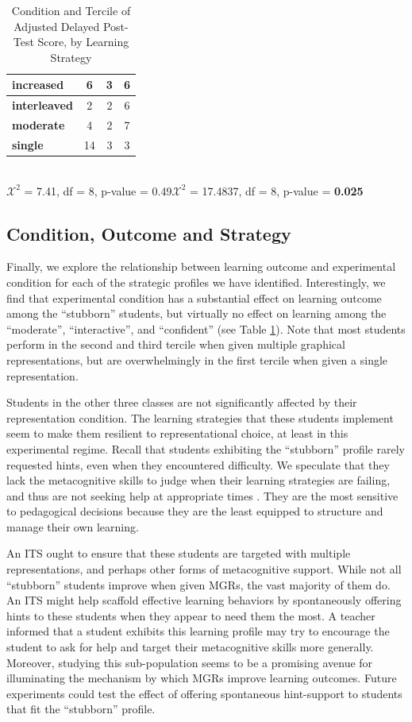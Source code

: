 \documentclass{edm_template}
\begin{document}
\begin{table}[htbp]
\begin{center}
\begin{tabular}{|l || c | c | c |}
  \textbf{increased}&    6&  3&  6 \\ \hline
  \textbf{interleaved}&  2&  2&  6 \\ \hline
  \textbf{moderate}&     4&  2& 7 \\ \hline
  \textbf{single}&       14&  3&  3 \\ \hline
 \end{tabular}
\\$\mathcal{X}^2$ = 7.41, df = 8, p-value = 0.49\hspace{15pt}$\mathcal{X}^2$ = 17.4837, df = 8, p-value = {\bf 0.025}
\end{center}
\caption{Condition and Tercile of Adjusted Delayed Post-Test Score, by Learning Strategy}
\label{tab:exp-and-score-by-LS}
\end{table}


\subsection{Condition, Outcome and Strategy}

Finally, we explore the relationship between learning outcome and experimental condition for each of the strategic profiles we have identified. Interestingly, we find that experimental condition has a substantial effect on learning outcome among the ``stubborn'' students, but virtually no effect on learning among the ``moderate'', ``interactive'', and ``confident''  (see Table \ref{tab:exp-and-score-by-LS}).  Note that most students perform in the second and third tercile when given multiple graphical representations, but are overwhelmingly in the first tercile when given a single representation. 

Students in the other three classes are not significantly affected by their representation condition. The learning strategies that these students implement seem to make them resilient to representational choice, at least in this experimental regime. Recall that students exhibiting the ``stubborn'' profile rarely requested hints, even when they encountered difficulty. We speculate that they lack the metacognitive skills to judge when their learning strategies are failing, and thus are not seeking help at appropriate times \cite{Aleven2006}. They are the most sensitive to pedagogical decisions because they are the least equipped to structure and manage their own learning. 

An ITS ought to ensure that these students are targeted with multiple representations, and perhaps other forms of metacognitive support. While not all ``stubborn'' students improve when given MGRs, the vast majority of them do. An ITS might help scaffold effective learning behaviors by spontaneously offering hints to these students when they appear to need them the most. A teacher informed that a student exhibits this learning profile may try to encourage the student to ask for help and target their metacognitive skills more generally. Moreover, studying this sub-population seems to be a promising avenue for illuminating the mechanism by which MGRs improve learning outcomes. Future experiments could test the effect of offering spontaneous hint-support to students that fit the ``stubborn'' profile.
\end{document}
